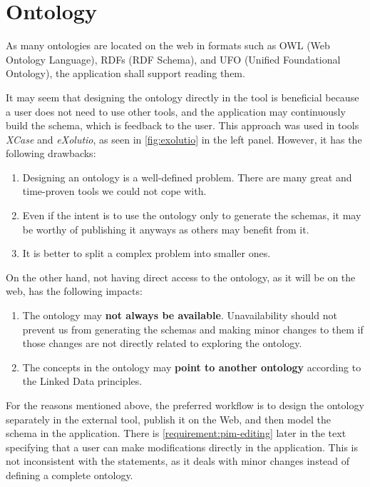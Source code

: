 \section{Ontology}

\begin{requirement}
    \label{requirement:ontologies-on-the-web}
    As many ontologies are located on the web in formats such as OWL (Web Ontology Language), RDFs (RDF Schema), and UFO (Unified Foundational Ontology), the application shall support reading them.
\end{requirement}

It may seem that designing the ontology directly in the tool is beneficial because a user does not need to use other tools, and the application may continuously build the schema, which is feedback to the user. This approach was used in tools \textit{XCase} and \textit{eXolutio}, as seen in \autoref{fig:exolutio} in the left panel. However, it has the following drawbacks:

\begin{enumerate}
    \item Designing an ontology is a well-defined problem. There are many great and time-proven tools we could not cope with.
    \item Even if the intent is to use the ontology only to generate the schemas, it may be worthy of publishing it anyways as others may benefit from it.
    \item It is better to split a complex problem into smaller ones.
\end{enumerate}

On the other hand, not having direct access to the ontology, as it will be on the web, has the following impacts:

\begin{enumerate}
    \item The ontology may \textbf{not always be available}. Unavailability should not prevent us from generating the schemas and making minor changes to them if those changes are not directly related to exploring the ontology.
    \item The concepts in the ontology may \textbf{point to another ontology} according to the Linked Data principles.
\end{enumerate}

For the reasons mentioned above, the preferred workflow is to design the ontology separately in the external tool, publish it on the Web, and then model the schema in the application. There is \autoref{requirement:pim-editing} later in the text specifying that a user can make modifications directly in the application. This is not inconsistent with the statements, as it deals with minor changes instead of defining a complete ontology.


